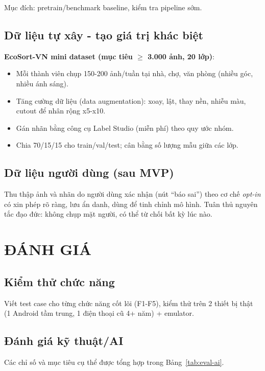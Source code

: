 \documentclass[13pt,a4paper,oneside]{report}
\begin{document}
Mục đích: pretrain/benchmark baseline, kiểm tra pipeline sớm.

\section{Dữ liệu tự xây - tạo giá trị khác biệt}

\textbf{EcoSort-VN mini dataset (mục tiêu $\geq$ 3.000 ảnh, 20 lớp)}:

\begin{itemize}[leftmargin=1.5cm]
    \item Mỗi thành viên chụp 150-200 ảnh/tuần tại nhà, chợ, văn phòng (nhiều góc, nhiều ánh sáng).
    \item Tăng cường dữ liệu (data augmentation): xoay, lật, thay nền, nhiễu màu, cutout để nhân rộng x5-x10.
    \item Gán nhãn bằng công cụ Label Studio (miễn phí) theo quy ước nhóm.
    \item Chia 70/15/15 cho train/val/test; cân bằng số lượng mẫu giữa các lớp.
\end{itemize}

\section{Dữ liệu người dùng (sau MVP)}

Thu thập ảnh và nhãn do người dùng xác nhận (nút ``báo sai'') theo cơ chế \textit{opt-in} có xin phép rõ ràng, lưu ẩn danh, dùng để tinh chỉnh mô hình. Tuân thủ nguyên tắc đạo đức: không chụp mặt người, có thể từ chối bất kỳ lúc nào.

\chapter{ĐÁNH GIÁ}

\section{Kiểm thử chức năng}

Viết test case cho từng chức năng cốt lõi (F1-F5), kiểm thử trên 2 thiết bị thật (1 Android tầm trung, 1 điện thoại cũ 4+ năm) + emulator.

\section{Đánh giá kỹ thuật/AI}

Các chỉ số và mục tiêu cụ thể được tổng hợp trong Bảng~\ref{tab:eval-ai}.
\end{document}
